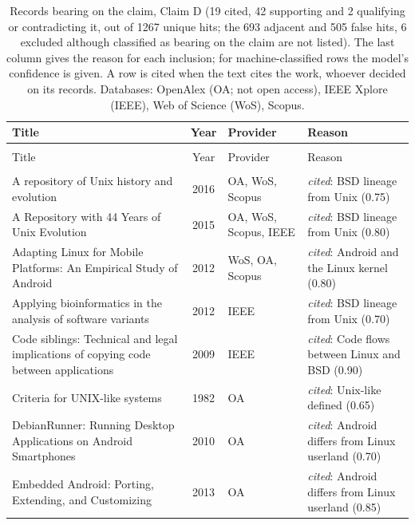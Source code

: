 \begin{longtable}{@{}%
  >{\raggedright\arraybackslash}p{}c%
  >{\raggedright\arraybackslash}p{}%
  >{\raggedright\arraybackslash}p{}@{}}
\caption{Records bearing on the claim, Claim D (19 cited, 42 supporting and 2 qualifying or contradicting it, out of 1267 unique hits; the 693 adjacent and 505 false hits, 6 excluded although classified as bearing on the claim are not listed). The last column gives the reason for each inclusion; for machine-classified rows the model's confidence is given. A row is cited when the text cites the work, whoever decided on its records. Databases: OpenAlex (OA; not open access), IEEE Xplore (IEEE), Web of Science (WoS), Scopus.}\label{tab:sok-unix-lineage}\\
\toprule
Title & Year & Provider & Reason \\
\midrule
\endfirsthead
\multicolumn{4}{@{}l}{\emph{\tablename~\thetable{} (cont.)}}\\
\toprule
Title & Year & Provider & Reason \\
\midrule
\endhead
\midrule \multicolumn{4}{r@{}}{\emph{continued on next page}}\\
\endfoot
\bottomrule
\endlastfoot
A repository of Unix history and evolution & 2016 & OA, WoS, Scopus & \emph{cited}: BSD lineage from Unix (0.75) \\
A Repository with 44 Years of Unix Evolution & 2015 & OA, WoS, Scopus, IEEE & \emph{cited}: BSD lineage from Unix (0.80) \\
Adapting Linux for Mobile Platforms: An Empirical Study of Android & 2012 & WoS, OA, Scopus & \emph{cited}: Android and the Linux kernel (0.80) \\
Applying bioinformatics in the analysis of software variants & 2012 & IEEE & \emph{cited}: BSD lineage from Unix (0.70) \\
Code siblings: Technical and legal implications of copying code between applications & 2009 & IEEE & \emph{cited}: Code flows between Linux and BSD (0.90) \\
Criteria for UNIX-like systems & 1982 & OA & \emph{cited}: Unix-like defined (0.65) \\
DebianRunner: Running Desktop Applications on Android Smartphones & 2010 & OA & \emph{cited}: Android differs from Linux userland (0.70) \\
Embedded Android: Porting, Extending, and Customizing & 2013 & OA & \emph{cited}: Android differs from Linux userland (0.85) \\

\end{longtable}
